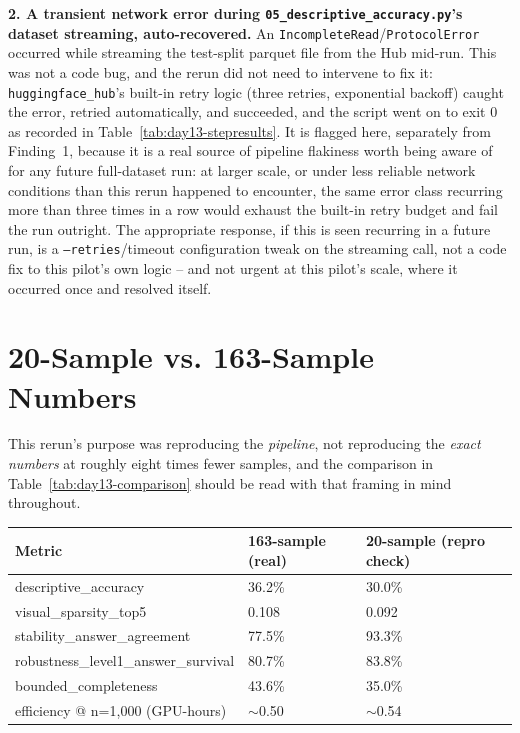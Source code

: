 \textbf{2. A transient network error during \texttt{05\_descriptive\_accuracy.py}'s dataset
streaming, auto-recovered.} An \texttt{IncompleteRead}/\texttt{ProtocolError} occurred while
streaming the test-split parquet file from the Hub mid-run. This was not a code bug, and the rerun
did not need to intervene to fix it: \texttt{huggingface\_hub}'s built-in retry logic (three retries,
exponential backoff) caught the error, retried automatically, and succeeded, and the script went on
to exit 0 as recorded in Table~\ref{tab:day13-stepresults}. It is flagged here, separately from
Finding~1, because it is a real source of pipeline flakiness worth being aware of for any future
full-dataset run: at larger scale, or under less reliable network conditions than this rerun
happened to encounter, the same error class recurring more than three times in a row would exhaust
the built-in retry budget and fail the run outright. The appropriate response, if this is seen
recurring in a future run, is a \texttt{--retries}/timeout configuration tweak on the streaming call,
not a code fix to this pilot's own logic -- and not urgent at this pilot's scale, where it occurred
once and resolved itself.

\section{20-Sample vs. 163-Sample Numbers}

This rerun's purpose was reproducing the \emph{pipeline}, not reproducing the \emph{exact numbers}
at roughly eight times fewer samples, and the comparison in Table~\ref{tab:day13-comparison} should
be read with that framing in mind throughout.

\begin{center}
\begin{tabular}{p{5.4cm}p{2.8cm}p{3.2cm}}
\toprule
\textbf{Metric} & \textbf{163-sample (real)} & \textbf{20-sample (repro check)} \\
\midrule
descriptive\_accuracy & 36.2\% & 30.0\% \\
visual\_sparsity\_top5 & 0.108 & 0.092 \\
stability\_answer\_agreement & 77.5\% & 93.3\% \\
robustness\_level1\_answer\_survival & 80.7\% & 83.8\% \\
bounded\_completeness & 43.6\% & 35.0\% \\
efficiency @ n=1{,}000 (GPU-hours) & $\sim$0.50 & $\sim$0.54 \\
\bottomrule
\end{tabular}
\label{tab:day13-comparison}
\end{center}

